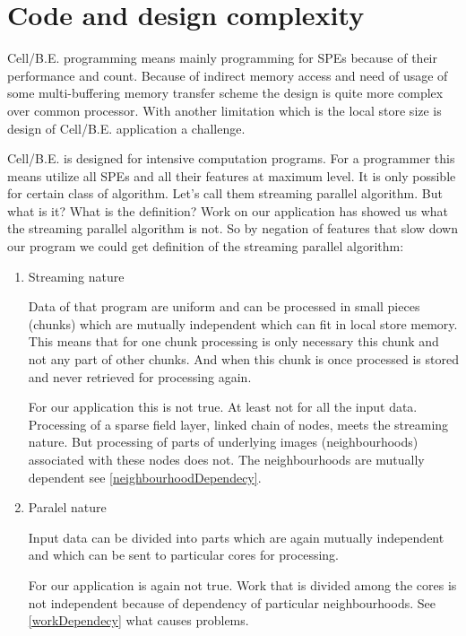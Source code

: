 \section{Code and design complexity}

\par
Cell/B.E. programming means mainly programming for SPEs because of their performance and count.
Because of indirect memory access and need of usage of some multi-buffering memory transfer scheme the design is quite more complex over common processor.
With another limitation which is the local store size is design of Cell/B.E. application a challenge.

\par
Cell/B.E. is designed for intensive computation programs.
For a programmer this means utilize all SPEs and all their features at maximum level.
It is only possible for certain class of algorithm.
Let's call them streaming parallel algorithm.
But what is it? What is the definition?
Work on our application has showed us what the streaming parallel algorithm is not.
So by negation of features that slow down our program we could get definition of the streaming parallel algorithm:
\begin{enumerate}

\item{Streaming nature}
\par
Data of that program are uniform and can be processed in small pieces (chunks) which are mutually independent which can fit in local store memory.
This means that for one chunk processing is only necessary this chunk and not any part of other chunks.
And when this chunk is once processed is stored and never retrieved for processing again.

\par
For our application this is not true.
At least not for all the input data.
Processing of a sparse field layer, linked chain of nodes, meets the streaming nature.
But processing of parts of underlying images (neighbourhoods) associated with these nodes does not.
The neighbourhoods are mutually dependent see \ref{neighbourhoodDependecy}.

\item{Paralel nature}
\par
Input data can be divided into parts which are again mutually independent and which can be sent to particular cores for processing.

\par
For our application is again not true.
Work that is divided among the cores is not independent because of dependency of particular neighbourhoods.
See \ref{workDependecy} what causes problems.

\end{enumerate}

